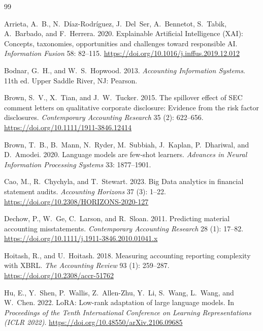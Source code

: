 \documentclass[12pt,letterpaper]{article}
\begin{document}
\begin{thebibliography}{99}

Arrieta, A.~B., N.~D{\'i}az-Rodr{\'i}guez, J.~Del~Ser,
  A.~Bennetot, S.~Tabik, A.~Barbado, and F.~Herrera. 2020.
\newblock Explainable Artificial Intelligence (XAI): Concepts,
  taxonomies, opportunities and challenges toward responsible AI.
\newblock \textit{Information Fusion} 58: 82--115.
\newblock \url{https://doi.org/10.1016/j.inffus.2019.12.012}

Bodnar, G.~H., and W.~S.~Hopwood. 2013.
\newblock \textit{Accounting Information Systems}. 11th ed.
\newblock Upper Saddle River, NJ: Pearson.

Brown, S.~V., X.~Tian, and J.~W.~Tucker. 2015.
\newblock The spillover effect of SEC comment letters on qualitative
  corporate disclosure: Evidence from the risk factor disclosures.
\newblock \textit{Contemporary Accounting Research} 35 (2): 622--656.
\newblock \url{https://doi.org/10.1111/1911-3846.12414}

Brown, T.~B., B.~Mann, N.~Ryder, M.~Subbiah, J.~Kaplan,
  P.~Dhariwal, and D.~Amodei. 2020.
\newblock Language models are few-shot learners.
\newblock \textit{Advances in Neural Information Processing
  Systems} 33: 1877--1901.

Cao, M., R.~Chychyla, and T.~Stewart. 2023.
\newblock Big Data analytics in financial statement audits.
\newblock \textit{Accounting Horizons} 37 (3): 1--22.
\newblock \url{https://doi.org/10.2308/HORIZONS-2020-127}

Dechow, P., W.~Ge, C.~Larson, and R.~Sloan. 2011.
\newblock Predicting material accounting misstatements.
\newblock \textit{Contemporary Accounting Research} 28 (1): 17--82.
\newblock \url{https://doi.org/10.1111/j.1911-3846.2010.01041.x}

Hoitash, R., and U.~Hoitash. 2018.
\newblock Measuring accounting reporting complexity with XBRL.
\newblock \textit{The Accounting Review} 93 (1): 259--287.
\newblock \url{https://doi.org/10.2308/accr-51762}

Hu, E., Y.~Shen, P.~Wallis, Z.~Allen-Zhu, Y.~Li, S.~Wang,
  L.~Wang, and W.~Chen. 2022.
\newblock LoRA: Low-rank adaptation of large language models.
\newblock In \textit{Proceedings of the Tenth International Conference
  on Learning Representations (ICLR 2022)}.
\newblock \url{https://doi.org/10.48550/arXiv.2106.09685}


\end{thebibliography}
\end{document}
